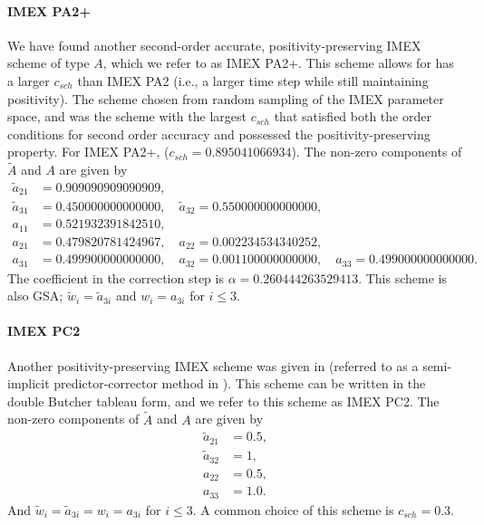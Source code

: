 \paragraph{IMEX PA2+}

We have found another second-order accurate, positivity-preserving IMEX scheme of type $A$, which we refer to as IMEX PA2+.  
This scheme allows for has a larger $c_{sch}$ than IMEX PA2 (i.e., a larger time step while still maintaining positivity).  
The scheme chosen from random sampling of the IMEX parameter space, and was the scheme with the largest $c_{sch}$ that satisfied both the order conditions for second order accuracy and possessed the positivity-preserving property.  
For IMEX PA2+, ($c_{sch} = 0.895041066934$). 
The non-zero components of $\tilde{A}$ and $A$ are given by
\begin{align}
  \tilde{a}_{21} &= 0.909090909090909, \nonumber \\
  \tilde{a}_{31} &= 0.450000000000000, \quad \tilde{a}_{32} = 0.550000000000000, \nonumber \\
  a_{11} &= 0.521932391842510, \nonumber \\
  a_{21} &= 0.479820781424967, \quad a_{22} = 0.002234534340252, \nonumber \\
  a_{31} &= 0.499900000000000, \quad a_{32} = 0.001100000000000, \quad a_{33} = 0.499000000000000. \nonumber
\end{align}
The coefficient in the correction step is $\alpha = 0.260444263529413$.  
This scheme is also GSA; $\tilde{w}_{i}=\tilde{a}_{3i}$ and $w_{i}=a_{3i}$ for $i\le3$.

\paragraph{IMEX PC2}

Another positivity-preserving IMEX scheme was given in \cite{mcclareen_2008} (referred to as a semi-implicit predictor-corrector method in \cite{mcclareen_2008}).  
This scheme can be written in the double Butcher tableau form, and we refer to this scheme as IMEX PC2.  
The non-zero components of $\tilde{A}$ and $A$ are given by
\begin{align}
  \tilde{a}_{21} &= 0.5, \nonumber \\
  \tilde{a}_{32} &= 1, \nonumber \\
  a_{22} &= 0.5, \nonumber \\
  a_{33} &= 1.0. \nonumber
\end{align}
And $\tilde{w}_{i}=\tilde{a}_{3i} = w_{i}=a_{3i}$ for $i\le3$.
A common choice of this scheme is $c_{sch} = 0.3$.

